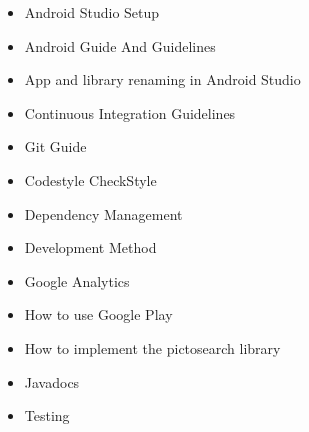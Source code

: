 \begin{itemize}
	\item Android Studio Setup
    \item Android Guide And Guidelines
    \item App and library renaming in Android Studio
    \item Continuous Integration Guidelines
    \item Git Guide
    \item Codestyle CheckStyle
    \item Dependency Management
    \item Development Method
    \item Google Analytics
    \item How to use Google Play
    \item How to implement the pictosearch library
    \item Javadocs
    \item Testing
\end{itemize}


